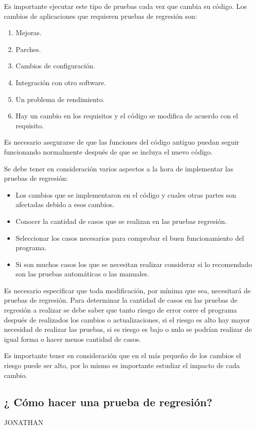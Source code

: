 \documentclass[conference]{IEEEtran}
\begin{document}
Es importante ejecutar este tipo de pruebas cada vez que cambia su código. Los cambios de aplicaciones que requieren pruebas de regresión son:

\begin{enumerate}[1.]
\item Mejoras.
\item Parches.
\item Cambios de configuración.
\item Integración con otro software.
\item Un problema de rendimiento.
\item Hay un cambio en los requisitos y el código se modifica de acuerdo con el requisito.
\end{enumerate}

Es necesario asegurarse de que las funciones del código antiguo puedan seguir funcionando normalmente después de que se incluya el nuevo código.

Se debe tener en consideración varios aspectos a la hora de implementar las pruebas de regresión:

\begin{itemize}
\item Los cambios que se implementaron en el código y cuales otras partes son afectadas debido a esos cambios.
\item Conocer la cantidad de casos que se realizan en las pruebas regresión.
\item Seleccionar los casos necesarios para comprobar el buen funcionamiento del programa.
\item Si son muchos casos los que se necesitan realizar considerar si lo recomendado son las pruebas automáticas o las manuales.
\end{itemize}

Es necesario especificar que toda modificación, por mínima que sea, necesitará de pruebas de regresión. 
Para determinar la cantidad de casos en las pruebas de regresión a realizar se debe saber que tanto riesgo de error corre el programa después de realizados los cambios o actualizaciones, si el riesgo es alto hay mayor necesidad de realizar las pruebas, si es riesgo es bajo o nulo se podrían realizar de igual forma o hacer menos cantidad de casos.

Es importante tener en consideración que en el más pequeño de los cambios el riesgo puede ser alto, por lo mismo es importante estudiar el impacto de cada cambio.



\subsection{¿ Cómo hacer una prueba de regresión?}
JONATHAN
\end{document}

